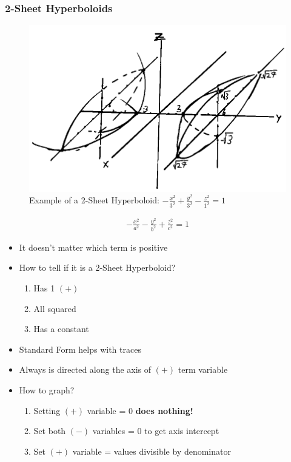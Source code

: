 \documentclass{article}
\begin{document}
\subsubsection{2-Sheet Hyperboloids}
\begin{figure}[h]
  \includegraphics[scale=0.5]{2-sheet-hyperboloid}
  \centering
  \caption{Example of a 2-Sheet Hyperboloid: $-\frac{x^2}{3^2} + \frac{y^2}{3^2} - \frac{z^2}{1^2} = 1$}
  \label{fig:2-sheet-hyperboloid}
\end{figure}
\begin{align}
  -\frac{x^2}{a^2} - \frac{y^2}{b^2} + \frac{z^2}{c^2} = 1
\end{align}
\begin{itemize}
  \item It doesn't matter which term is positive
  \item How to tell if it is a 2-Sheet Hyperboloid?
  \begin{enumerate}
    \item Has 1 $(+)$
    \item All squared
    \item Has a constant
  \end{enumerate}
  \item Standard Form helps with traces
  \item Always is directed along the axis of $(+)$ term variable
  \item How to graph?
  \begin{enumerate}
    \item Setting $(+)$ variable = 0 \textbf{does nothing!}
    \item Set both $(-)$ variables = 0 to get axis intercept
    \item Set $(+)$ variable = values divisible by denominator
  \end{enumerate}
\end{itemize}
\end{document}
